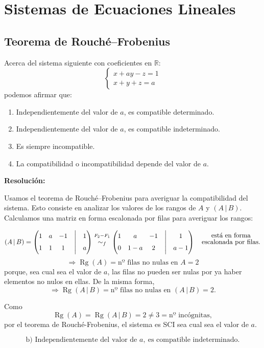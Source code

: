 \documentclass[a4paper,12pt]{article}
\begin{document}
\section{Sistemas de Ecuaciones Lineales}

\subsection{Teorema de Rouché--Frobenius}

\begin{ejercicio}[title=Ejercicio 27]
Acerca del sistema siguiente con coeficientes en $\mathbb{R}$:
\[
\begin{cases}
x + ay - z = 1\\
x + y + z = a
\end{cases}
\]
podemos afirmar que:

\begin{enumerate}
\item[a)] Independientemente del valor de $a$, es compatible determinado.
\item[b)] Independientemente del valor de $a$, es compatible indeterminado.
\item[c)] Es siempre incompatible.
\item[d)] La compatibilidad o incompatibilidad depende del valor de $a$.
\end{enumerate}

\tcblower
\textbf{Resolución:}

Usamos el teorema de Rouché–Frobenius para averiguar la compatibilidad del sistema. Esto consiste en analizar los valores de los rangos de $A$ y $(A\,|\,B)$. Calculamos una matriz en forma escalonada por filas para averiguar los rangos:

\[
(A\,|\,B)=
\begin{pmatrix}
1 & a & -1 &\Big|& 1\\
1 & 1 &  1 &\Big|& a
\end{pmatrix}
\overset{\substack{F_2 - F_1\\{}}}{\sim_f}
\begin{pmatrix}
1 & a & -1 &\Big|& 1\\
0 & 1-a & 2 &\Big|& a-1
\end{pmatrix} \quad \text{\shortstack{ está en forma\\escalonada por filas.}}
\]
\[
\Rightarrow \operatorname{Rg}(A)=\text{nº filas no nulas en }A = 2
\]
porque, sea cual sea el valor de $a$, las filas no pueden ser nulas por ya haber elementos no nulos en ellas. 
De la misma forma,
\[
\Rightarrow \operatorname{Rg}(A\,|\,B)=\text{nº filas no nulas en }(A\,|\,B)=2.
\]

Como
\[
\operatorname{Rg}(A)=\operatorname{Rg}(A\,|\,B)=2 \neq 3=\text{nº incógnitas},
\]
por el teorema de Rouché-Frobenius, el sistema es SCI sea cual sea el valor de \(a\).

\[
\boxed{\text{b) Independientemente del valor de }a,\ \text{es compatible indeterminado.}}
\]
\end{ejercicio}
\end{document}
